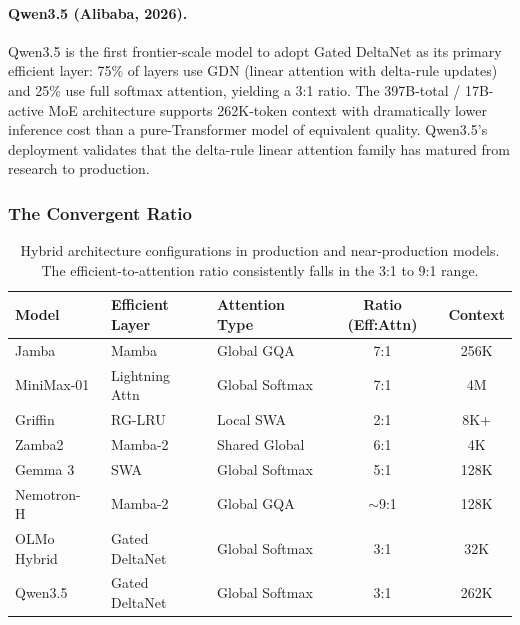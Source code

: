 \paragraph{Qwen3.5 (Alibaba, 2026).}
Qwen3.5 is the first frontier-scale model to adopt Gated DeltaNet as its primary efficient layer: 75\% of layers use GDN (linear attention with delta-rule updates) and 25\% use full softmax attention, yielding a 3:1 ratio. The 397B-total / 17B-active MoE architecture supports 262K-token context with dramatically lower inference cost than a pure-Transformer model of equivalent quality. Qwen3.5's deployment validates that the delta-rule linear attention family has matured from research to production.

\subsubsection{The Convergent Ratio}

\begin{table}[t]
\centering
\caption{Hybrid architecture configurations in production and near-production models. The efficient-to-attention ratio consistently falls in the 3:1 to 9:1 range.}
\label{tab:hybrid}
\small
\begin{tabular}{lllcc}
\toprule
\textbf{Model} & \textbf{Efficient Layer} & \textbf{Attention Type} & \textbf{Ratio (Eff:Attn)} & \textbf{Context} \\
\midrule
Jamba~\cite{lieber2024jamba_tr}       & Mamba          & Global GQA     & 7:1  & 256K \\
MiniMax-01~\cite{minimax2025}         & Lightning Attn & Global Softmax & 7:1  & 4M \\
Griffin~\cite{de2024griffin}           & RG-LRU         & Local SWA      & 2:1  & 8K+ \\
Zamba2~\cite{zyphra2024zamba2}        & Mamba-2        & Shared Global  & 6:1  & 4K \\
Gemma 3~\cite{gemma2025gemma3}        & SWA            & Global Softmax & 5:1  & 128K \\
Nemotron-H~\cite{nvidia2025nemotronh} & Mamba-2        & Global GQA     & $\sim$9:1 & 128K \\
OLMo Hybrid                           & Gated DeltaNet & Global Softmax & 3:1  & 32K \\
Qwen3.5                               & Gated DeltaNet & Global Softmax & 3:1  & 262K \\
\bottomrule
\end{tabular}
\end{table}

